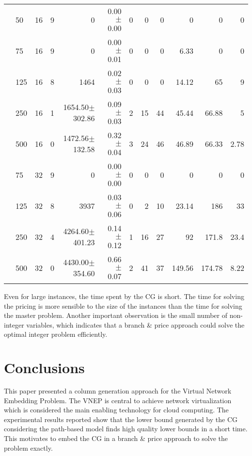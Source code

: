 \documentclass[conference]{IEEEtran}
\begin{document}
\begin{table*}[h]
\begin{center}
\begin{tabular}{c l l c r r r r r r r r}
 &50      &  16  &    9  &  0                   &        0.00$\pm$0.00  &  0  &          0   &            0   &         0       &       0       &  0       \\
 &75      &  16  &    9  &  0                   &        0.00$\pm$0.01  &  0  &          0   &            0   &         6.33    &       0       &  0       \\
 &125     &  16  &    8  &  1464                &        0.02$\pm$0.03  &  0  &          0   &            0   &         14.12   &       65      &  9       \\
 &250     &  16  &    1  &  1654.50$\pm$302.86  &        0.09$\pm$0.03  &  2  &          15  &            44  &         45.44   &       66.88   &  5       \\
 &500     &  16  &    0  &  1472.56$\pm$132.58  &        0.32$\pm$0.04  &  3  &          24  &            46  &         46.89   &       66.33   &  2.78    \\
 &75      &  32  &    9  &  0                   &        0.00$\pm$0.00  &  0  &          0   &            0   &         0       &       0       &  0       \\
 &125     &  32  &    8  &  3937                &        0.03$\pm$0.06  &  0  &          2   &            10  &         23.14   &       186     &  33      \\
 &250     &  32  &    4  &  4264.60$\pm$401.23  &        0.14$\pm$0.12  &  1  &          16  &            27  &         92      &       171.8   &  23.4    \\
 &500     &  32  &    0  &  4430.00$\pm$354.60  &        0.66$\pm$0.07  &  2  &          41  &            37  &         149.56  &       174.78  &  8.22    \\

\end{tabular}
\end{center}
\end{table*}

Even for large instances, the time spent by the CG is short. 
The time for solving the pricing is more sensible to the size of the instances than the time for solving the master problem.
Another important observation is the small number of non-integer variables, which indicates that a branch \& price approach
could solve the optimal integer problem efficiently.

\section{Conclusions}
\label{sec:conclusion}
This paper presented a column generation approach for the 
Virtual Network Embedding Problem. 
The VNEP is central to achieve network virtualization which is considered the main enabling technology for cloud computing.
The experimental results reported show that the lower bound generated by the CG considering the path-based model
finds high quality lower bounds in a short time. This motivates to embed the CG in a branch \& price approach to solve the problem exactly.
\end{document}
